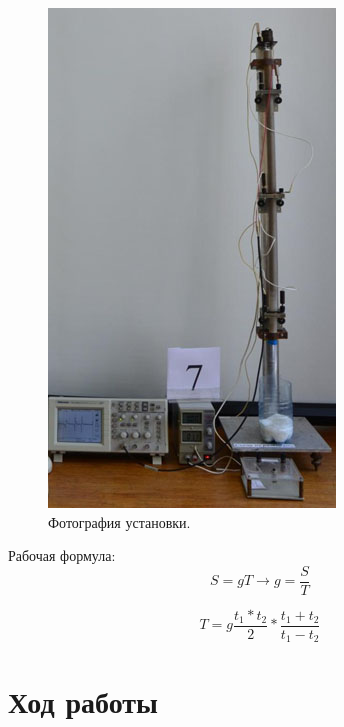 \documentclass[a4paper,12pt]{article}
\begin{document}
\begin{figure}[h!]
	\begin{center}
		\includegraphics[scale=0.8]{ust.jpg}
	\end{center}
	\caption{Фотография установки.}
\end{figure}

Рабочая формула:
\begin{equation}
    S = gT \longrightarrow g = \frac{S}{T}
\end{equation}

\begin{equation}
    T = g\frac{t_1*t_2}{2} * \frac{t_1+t_2}{t_1-t_2}
\end{equation}

\clearpage
\section{Ход работы}
  
\end{document}
